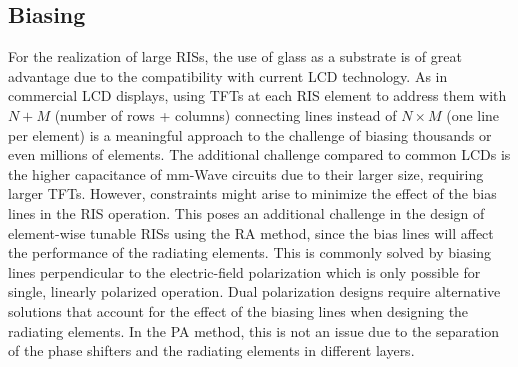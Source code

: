 \subsection{Biasing}
\label{ss:biasing}
For the realization of large \glspl{RIS}, the use of glass as a substrate is of great advantage due to the compatibility with current \gls{LCD} technology.
As in commercial \gls{LCD} displays, using \glspl{TFT} at each \gls{RIS} element to address them with $N+M$ (number of rows + columns) connecting lines instead of $N \times M$ (one line per element) is a meaningful approach to the challenge of biasing thousands or even millions of elements.
The additional challenge compared to common \glspl{LCD} is the higher capacitance of \gls{mm-Wave} circuits due to their larger size, requiring larger \glspl{TFT}. 
However, constraints might arise to minimize the effect of the bias lines in the \gls{RIS} operation.
This poses an additional challenge in the design of element-wise tunable \glspl{RIS} using the \gls{RA} method, since the bias lines will affect the performance of the radiating elements. 
This is commonly solved by biasing lines perpendicular to the electric-field polarization which is only possible for single, linearly polarized operation. Dual polarization designs require alternative solutions that account for the effect of the biasing lines when designing the radiating elements.
In the \gls{PA} method, this is not an issue due to the separation of the phase shifters and the radiating elements in different layers.



